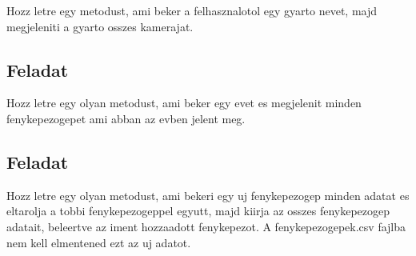 \documentclass{article}
\begin{document}
Hozz letre egy metodust, ami beker a felhasznalotol egy gyarto nevet, majd megjeleniti a gyarto osszes kamerajat.

\subsection{Feladat}

Hozz letre egy olyan metodust, ami beker egy evet es megjelenit minden fenykepezogepet ami abban az evben jelent meg.

\subsection{Feladat}

Hozz letre egy olyan metodust, ami bekeri egy uj fenykepezogep minden adatat es eltarolja a tobbi fenykepezogeppel egyutt, majd kiirja az osszes fenykepezogep adatait, beleertve az iment hozzaadott fenykepezot. A fenykepezogepek.csv fajlba nem kell elmentened ezt az uj adatot.
\end{document}
